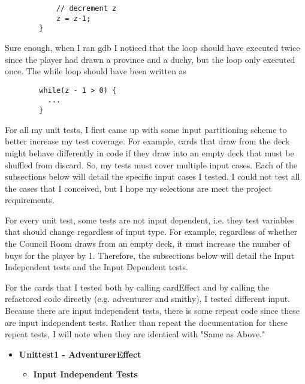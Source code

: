\documentclass[11pt,letterpaper]{article}
\begin{document}
\begin{enumerate}[label=\Roman*.]
\begin{enumerate}[label=\arabic*]
\begin{lstlisting}
            // decrement z
            z = z-1;
        }
        \end{lstlisting}
        Sure enough, when I ran gdb I noticed that the loop should have 
        executed twice since the player had drawn a province and a duchy,
        but the loop only executed once. The while loop should have been 
        written as 
        \begin{lstlisting}
        while(z - 1 > 0) {
          ...
        }
        \end{lstlisting}


        
    \end{enumerate}
    
    For all my unit tests, I first came up with some input partitioning scheme
    to better increase my test coverage. For example, cards that draw from the
    deck might behave differently in code if they draw into an empty deck that
    must be shuffled from discard. So, my tests must cover multiple input cases. 
    Each of the subsections below will detail the specific input cases I tested. 
    I could not test all the cases that I conceived, 
    but I hope my selections are meet the project requirements. 

    For every unit test, some tests are not 
    input dependent, i.e. they test variables that should change regardless of
    input type. For example, regardless of whether the Council Room draws from
    an empty deck, it must increase the number of buys for the player by 1. 
    Therefore, the subsections below will detail the Input Independent tests
    and the Input Dependent tests. 

    For the cards that I tested both by calling cardEffect and by calling
    the refactored code directly (e.g. adventurer and smithy), I tested
    different input. Because there are input independent tests, there is
    some repeat code since these are input independent tests. Rather than
    repeat the documentation for these repeat tests, I will note when they
    are identical with "Same as Above."

    \begin{itemize}[leftmargin=*]
      \item \textbf{Unittest1 - AdventurerEffect}
        
        \begin{itemize}[leftmargin=*, label={}]
          \item \textbf{Input Independent Tests}


\end{itemize}
\end{itemize}
\end{enumerate}
\end{document}
